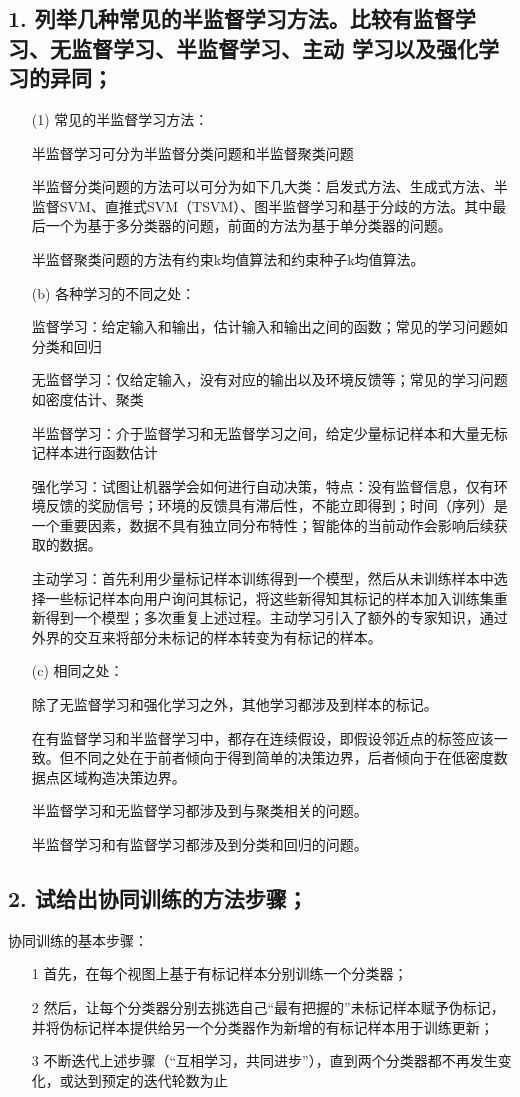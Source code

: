 \documentclass{article}
\date{\today}
\begin{document}
\makecover
\subsection*{1. 列举几种常见的半监督学习方法。比较有监督学习、无监督学习、半监督学习、主动 学习以及强化学习的异同；}
\begin{itemize}
\item[(1)]
常见的半监督学习方法：

半监督学习可分为半监督分类问题和半监督聚类问题

半监督分类问题的方法可以可分为如下几大类：启发式方法、生成式方法、半监督SVM、直推式SVM（TSVM）、图半监督学习和基于分歧的方法。其中最后一个为基于多分类器的问题，前面的方法为基于单分类器的问题。

半监督聚类问题的方法有约束k均值算法和约束种子k均值算法。
\item[(b)]
各种学习的不同之处：

监督学习：给定输入和输出，估计输入和输出之间的函数；常见的学习问题如分类和回归

无监督学习：仅给定输入，没有对应的输出以及环境反馈等；常见的学习问题如密度估计、聚类

半监督学习：介于监督学习和无监督学习之间，给定少量标记样本和大量无标记样本进行函数估计

强化学习：试图让机器学会如何进行自动决策，特点：没有监督信息，仅有环境反馈的奖励信号；环境的反馈具有滞后性，不能立即得到；时间（序列）是一个重要因素，数据不具有独立同分布特性；智能体的当前动作会影响后续获取的数据。

主动学习：首先利用少量标记样本训练得到一个模型，然后从未训练样本中选择一些标记样本向用户询问其标记，将这些新得知其标记的样本加入训练集重新得到一个模型；多次重复上述过程。主动学习引入了额外的专家知识，通过外界的交互来将部分未标记的样本转变为有标记的样本。
\item[(c)]
相同之处：

除了无监督学习和强化学习之外，其他学习都涉及到样本的标记。

在有监督学习和半监督学习中，都存在连续假设，即假设邻近点的标签应该一致。但不同之处在于前者倾向于得到简单的决策边界，后者倾向于在低密度数据点区域构造决策边界。

半监督学习和无监督学习都涉及到与聚类相关的问题。

半监督学习和有监督学习都涉及到分类和回归的问题。

\end{itemize}

\subsection*{2. 试给出协同训练的方法步骤；}
协同训练的基本步骤：
\begin{itemize}
\item[1]
首先，在每个视图上基于有标记样本分别训练一个分类器；
\item[2]
然后，让每个分类器分别去挑选自己“最有把握的”未标记样本赋予伪标记，并将伪标记样本提供给另一个分类器作为新增的有标记样本用于训练更新；
\item[3]
不断迭代上述步骤（“互相学习，共同进步”），直到两个分类器都不再发生变化，或达到预定的迭代轮数为止
\end{itemize}
\end{document}
